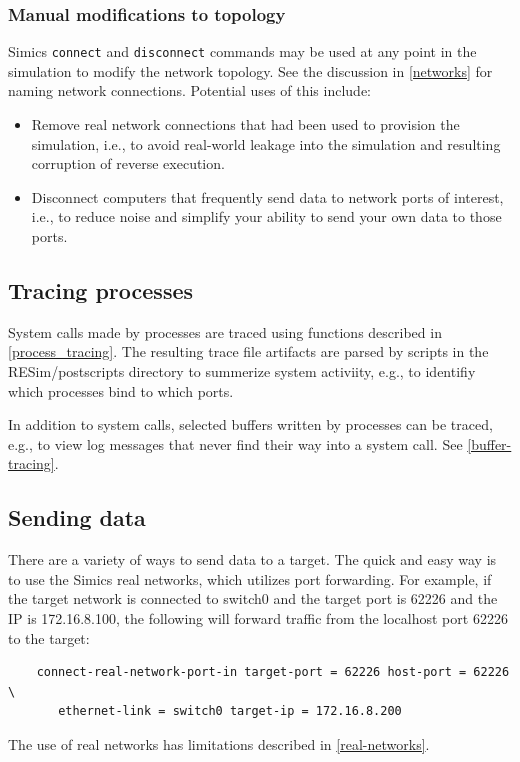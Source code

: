 \documentclass[titlepage]{article}
\begin{document}
\subsubsection{Manual modifications to topology}
\label{manual_net_mods}
Simics {\tt connect} and {\tt disconnect} commands may be used at any point in the simulation to modify the
network topology.  See the discussion in \ref{networks} for naming network connections.  Potential uses of this include:
\begin{itemize}
\item Remove real network connections that had been used to provision the simulation, i.e., to avoid real-world leakage
into the simulation and resulting corruption of reverse execution.
\item Disconnect computers that frequently send data to network ports of interest, i.e., to reduce noise and simplify your
ability to send your own data to those ports.
\end{itemize}

\subsection{Tracing processes}
System calls made by processes are traced using functions described in \ref{process_tracing}.
The resulting trace file artifacts are parsed by scripts in the RESim/postscripts directory to summerize system activiity, e.g.,
to identifiy which processes bind to which ports.

In addition to system calls, selected buffers written by processes can be traced, e.g., to view log messages that never find their
way into a system call.  See \ref{buffer-tracing}.

\subsection{Sending data}
\label{sending-data}
There are a variety of ways to send data to a target.  The quick and easy way is to use the Simics real networks, which utilizes
port forwarding.  For example, if the target network is connected to switch0 and the target port is 62226 and the IP is
172.16.8.100, the following will forward traffic from the localhost port 62226 to the target: 
\begin{verbatim}
    connect-real-network-port-in target-port = 62226 host-port = 62226 \
       ethernet-link = switch0 target-ip = 172.16.8.200
\end{verbatim}
The use of real networks has limitations described in \ref{real-networks}.
\end{document}
